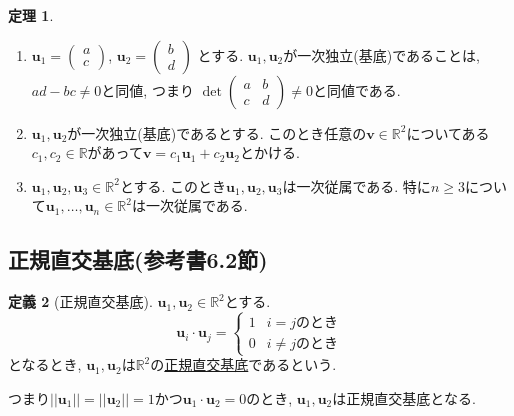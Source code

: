 \documentclass[dvipdfmx,a4paper,11pt]{article}
\newcommand{\R}{\mathbb{R}}
\theoremstyle{definition}
\newtheorem{thm}{定理}
\newtheorem{dfn}[thm]{定義}
\begin{document}
\begin{tcolorbox}[
    colback = white,
    colframe = green!35!black,
    fonttitle = \bfseries,
    breakable = true]
    \begin{thm}
    \begin{enumerate}
	\setlength{\parskip}{0cm}
  	\setlength{\itemsep}{0pt} 
\item $\bm{u}_1 =   
\begin{pmatrix}
a \\
 c
 \end{pmatrix} $, 
 $\bm{u}_2 =   
\begin{pmatrix}
b \\
 d
 \end{pmatrix} $
 とする. $\bm{u}_1, \bm{u}_2$が一次独立(基底)であることは, $ad-bc \neq 0$と同値, つまり
 $\det
 \begin{pmatrix}
a &b\\
 c&d
 \end{pmatrix} \neq 0$と同値である. 
 \item $\bm{u}_1, \bm{u}_2$が一次独立(基底)であるとする. このとき任意の$\bm{v} \in \R^2$についてある$c_1,c_2 \in \R$があって$\bm{v} = c_1\bm{u}_1 + c_2\bm{u}_2$とかける.
 \item  $\bm{u}_1, \bm{u}_2, \bm{u}_3 \in \R^2 $とする. このとき$\bm{u}_1, \bm{u}_2, \bm{u}_3$は一次従属である. 特に$n \ge 3$について$\bm{u}_1, \ldots, \bm{u}_n \in \R^2 $は一次従属である. 
\end{enumerate}
    \end{thm}
 \end{tcolorbox}




 
  \subsection{正規直交基底(参考書6.2節)}
 
   \begin{tcolorbox}[
    colback = white,
    colframe = green!35!black,
    fonttitle = \bfseries,
    breakable = true]
    \begin{dfn}[正規直交基底]
$\bm{u}_1, \bm{u}_2 \in \R^2$とする. 
$$
\bm{u}_i\cdot \bm{u}_j =
\left\{
\begin{array}{ll}
1 & \text{$i=j$のとき} \\
0 & \text{$i\neq j$のとき}
\end{array}
\right.
$$
となるとき, $\bm{u}_1, \bm{u}_2 $は$\R^2$の\underline{正規直交基底}であるという. 
  \end{dfn}
 \end{tcolorbox}
 つまり$||\bm{u}_1|| =||\bm{u}_2|| =1$かつ$\bm{u}_1\cdot \bm{u}_2 =0$のとき, $\bm{u}_1, \bm{u}_2 $は正規直交基底となる.
 
\end{document}
